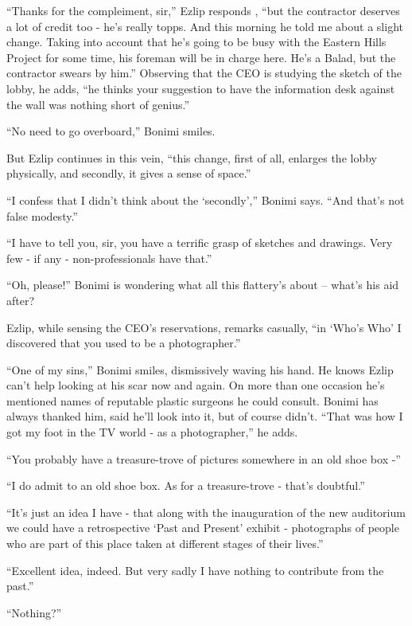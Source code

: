 \documentclass[twoside,11pt]{book}
\begin{document}
``Thanks for the compleiment, sir,'' Ezlip responds , ``but the contractor
deserves a lot of credit too - he's really topps. And this morning he told me about a slight change. Taking into
account that he's going to be busy with the Eastern Hills Project for some time, his foreman will be in charge here.
He's a Balad, but the contractor swears by him.'' Observing that the CEO is studying the
sketch of the lobby, he adds, ``he thinks your suggestion to have the information desk
against the wall was nothing short of genius.''

``No need to go overboard,'' Bonimi smiles.

But Ezlip continues in this vein, ``this change, first of all, enlarges the lobby physically, and secondly,
it gives a sense of space.''

``I confess that I didn't think about the `secondly','' Bonimi says. ``And that's
not false modesty.''

``I have to tell you, sir, you have a terrific grasp of sketches and drawings. Very few - if any -
non-professionals have that.''

``Oh, please!'' Bonimi is wondering what all this flattery's about -- what's his aid after?

Ezlip, while sensing the CEO's reservations, remarks casually, ``in `Who's Who' I discovered that you used
to be a photographer.''

``One of my sins,'' Bonimi smiles, dismissively waving his hand. He knows Ezlip can't help
looking at his scar now and again. On more than one occasion he's mentioned names of reputable plastic
surgeons he could consult. Bonimi has always thanked him, said he'll look into it, but of course didn't.
``That was how I got my foot in the TV world - as a photographer,'' he adds.

``You probably have a treasure-trove of pictures somewhere in an old shoe box -''

``I do admit to an old shoe box. As for a treasure-trove - that's doubtful.''

``It's just an idea I have - that along with the inauguration of the new auditorium we could have a
retrospective `Past and Present' exhibit - photographs of people who are part of this place taken at different stages
of their lives.''

``Excellent idea, indeed. But very sadly I have nothing to contribute from the past.''

``Nothing?''
\end{document}
